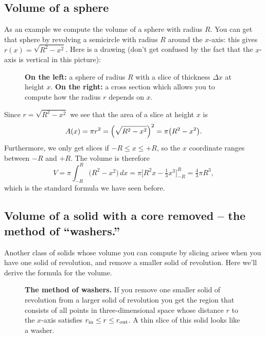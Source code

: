 \subsection{Volume of a sphere} %
\label{sec:volume-sphere}
As an example we compute the volume of a sphere with radius $R$.  You can get
that sphere by revolving a semicircle with radius $R$ around the $x$-axis: this gives 
$r(x)=\sqrt{R^2-x^2}$.  Here is a drawing (don't get confused
by the fact that the $x$-axis is vertical in this picture):

\begin{figure}[h]\centering
  
  \caption{\textbf{On the left:} a sphere of radius $R$ with a slice of
    thickness $\Delta x$ at height $x$. \textbf{On the right:} a cross section
    which allows you to compute how the radius $r$ depends on $x$.}
\end{figure}
Since $r=\sqrt{R^2-x^2}$ we see that the area of a slice at height $x$ is
\[
A(x) = \pi r^2 =\Bigl(\sqrt{R^2-x^2}\Bigr)^2 = \pi \bigl(R^2-x^2\bigr).
\]
Furthermore, we only get slices if $-R \leq x \leq +R$, so the $x$ coordinate ranges
between $-R$ and $+R$.  The volume is therefore
\[
V = \pi \int_{-R}^R \bigl(R^2-x^2\bigr) \,dx =\pi \bigl[R^2x - \tfrac13
x^3\bigr]_{-R}^R =\tfrac{4} {3}\pi R^3,
\]
which is the standard formula we have seen before.



\subsection{Volume of a solid with a core removed -- the method of ``washers.''} %
\label{sec:volume-solid-with-core-removed}
Another class of solids whose volume you can compute by slicing arises when you
have one solid of revolution, and remove a smaller solid of revolution.  Here
we'll derive the formula for the volume.

\begin{figure}[ht]\centering
  \parbox{175pt}{ }
  \parbox{175pt}{\footnotesize }
  \caption{\textbf{The method of washers.}  If you remove one smaller solid of
    revolution from a larger solid of revolution you get the region that
    consists of all points in three-dimensional space whose distance $r$ to the
    $x$-axis satisfies $r_{\rm in} \leq r\leq r_{\rm out}$.  A thin slice of
    this solid looks like a washer.  }
  \label{fig:09method-of-washers}
\end{figure}

